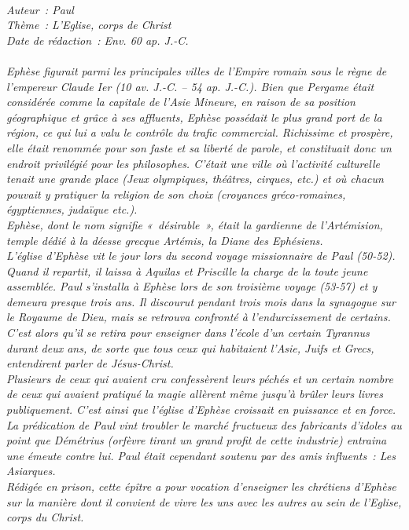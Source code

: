 \BFont
\noindent\hrulefill
{\footnotesize
\textit{
\bigskip
{\centering{}
\\Auteur~: Paul
\\Thème~: L'Eglise, corps de Christ
\\Date de rédaction~: Env. 60 ap. J.-C.\\}
}
\textit{
\\Ephèse figurait parmi les principales villes de l'Empire romain sous le règne de l'empereur Claude Ier (10 av. J.-C. – 54 ap. J.-C.). Bien que Pergame était considérée comme la capitale de l'Asie Mineure, en raison de sa position géographique et grâce à ses affluents, Ephèse possédait le plus grand port de la région, ce qui lui a valu le contrôle du trafic commercial. Richissime et prospère, elle était renommée pour son faste et sa liberté de parole, et constituait donc un endroit privilégié pour les philosophes. C'était une ville où l'activité culturelle tenait une grande place (Jeux olympiques, théâtres, cirques, etc.) et où chacun pouvait y pratiquer la religion de son choix (croyances gréco-romaines, égyptiennes, judaïque etc.).
\\Ephèse, dont le nom signifie «~désirable~», était la gardienne de l'Artémision, temple dédié à la déesse grecque Artémis, la Diane des Ephésiens.
\\L'église d'Ephèse vit le jour lors du second voyage missionnaire de Paul (50-52). Quand il repartit, il laissa à Aquilas et Priscille la charge de la toute jeune assemblée. Paul s'installa à Ephèse lors de son troisième voyage (53-57) et y demeura presque trois ans. Il discourut pendant trois mois dans la synagogue sur le Royaume de Dieu, mais se retrouva confronté à l'endurcissement de certains. C'est alors qu'il se retira pour enseigner dans l'école d'un certain Tyrannus durant deux ans, de sorte que tous ceux qui habitaient l'Asie, Juifs et Grecs, entendirent parler de Jésus-Christ.
\\Plusieurs de ceux qui avaient cru confessèrent leurs péchés et un certain nombre de ceux qui avaient pratiqué la magie allèrent même jusqu'à brûler leurs livres publiquement. C'est ainsi que l'église d'Ephèse croissait en puissance et en force. La prédication de Paul vint troubler le marché fructueux des fabricants d'idoles au point que Démétrius (orfèvre tirant un grand profit de cette industrie) entraina une émeute contre lui. Paul était cependant soutenu par des amis influents~: Les Asiarques.
\\Rédigée en prison, cette épître a pour vocation d'enseigner les chrétiens d'Ephèse sur la manière dont il convient de vivre les uns avec les autres au sein de l'Eglise, corps du Christ.\bigskip
}
}
